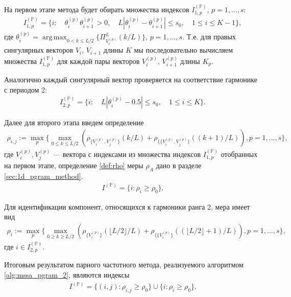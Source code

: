 \documentclass[specialist,
               substylefile = spbu.rtx,
               subf,href,colorlinks=true, 12pt]{disser}
\def\argmax{\mathop{\mathrm{argmax}}}
\def\argmax{\mathop{\mathrm{arg\,max}}}
\begin{document}
{{На первом этапе метода будет обирать множества индексов $I_{1,p}^{(\mathbb{P})}$, $p=1,\ldots,s$:
\begin{gather} \label{eq:I_1_P_mssa}
I_{1,p}^{(\mathbb{P})} = \{ i: \quad \theta_{i}^{(p)} \theta_{i+1} ^{(p)} >0, \quad L |\theta_i^{(p)} - \theta_{i+1}^{(p)}| \leqslant s_0, \quad 1 \leqslant i \leqslant K -1  \},
\end{gather}  
где $\theta_i^{(p)} = \argmax_{0 < k \leqslant L/2} \{\Pi_{V_i^{(p)}}^L(k/L)\}$, $p=1,\ldots,s$.
Т.е. для правых сингулярных векторов $V_i$, $V_{i+1}$ длины $K$ мы последовательно вычисляем множества $I_{1,p}^{(\mathbb{P})}$ для каждой пары векторов  $V_i^{(p)}$, $V_{i+1}^{(p)}$ длины $K_p$.

Аналогично каждый сингулярный вектор проверяется на соответствие гармонике с периодом 2:
\begin{gather} \label{eq:I_2_P_mssa}
I_{2,p}^{(\mathbb{P})} = \{i: \quad  L |\theta_{i}^{(p)} - 0.5 | \leqslant s_0, \quad 1 \leqslant i \leqslant K  \}.
\end{gather}  

Далее для второго этапа введем определение
\begin{gather*} 
\rho_{i,j} :=  \max_p \{ \max_{0 \leqslant k \leqslant L/2}{\left(\rho_{\{V_i^{(p)}, V_{j}^{(p)}\}}(k/L) + \rho_{\{\{V_i^{(p)}, V_{j}^{(p)}\}}((k+1)/L)\right)}, p=1,\ldots, s
 \},
\end{gather*}
где $V_i^{(p)}, V_{j}^{(p)}$ --- вектора с индексами из множества индексов $I_{1,p}^{(\mathbb{P})}$ отобранных на первом этапе,
определение \ref{def:rho} меры $\rho_A$ дано в разделе \ref{sec:1d_pgram_method}.
\begin{gather} \label{eq:pgram_I_p_mssa}
I^{(\mathbb{P})} = \{ i: \rho_{i} \geqslant\rho_0 \}.
\end{gather}

Для идентификации компонент, относящихся к гармоники ранга 2, мера имеет вид
\begin{gather*} 
\rho_{i} :=  \max_p \{ \max_{0 \geqslant k \geqslant L/2}{\left(\rho_{\{V_i^{(p)}\}}(\lfloor L/2 \rfloor/L) + \rho_{\{\{V_i^{(p)}\}}((\lfloor L/2 \rfloor + 1)/L)\right)}, p=1,\ldots, s
 \},
\end{gather*}
где $i \in I_{2,p}^{(\mathbb{P})}$.

Итоговым результатом парного частотного метода, реализуемого алгоритмом \ref{alg:mssa_pgram_2}, являются индексы 
\begin{gather} \label{eq:pgram_I_p_mssa}
I^{(\mathbb{P})} = \{ (i,j): \rho_{i,j} \geqslant\rho_0 \} \cup \{ i: \rho_{i} \geqslant\rho_0 \}.
\end{gather}

}}
\end{document}
